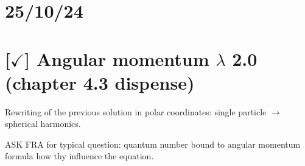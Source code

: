 \section{25/10/24}

\section{[$\checkmark$] Angular momentum $\lambda$ 2.0 (chapter 4.3 dispense)}

Rewriting of the previous solution in polar coordinates: single particle $\rightarrow$ spherical harmonics.

ASK FRA for typical question: quantum number bound to angular momentum formula how thy influence the equation.